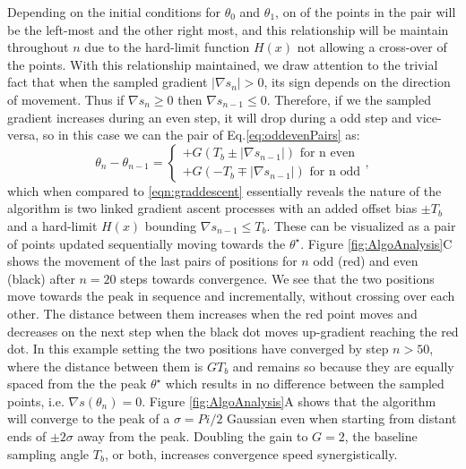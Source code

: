 \documentclass[10pt,a4paper]{article}
\begin{document}
Depending on the initial conditions for $\theta_0$ and $\theta_1$, on of the points in the pair will be the left-most and the other right most, and this relationship will be maintain throughout $n$ due to the hard-limit function $H(x)$ not allowing a cross-over of the points. With this relationship maintained, we draw attention to the trivial fact that when the sampled gradient $|\nabla s_n| > 0$, its sign depends on the direction of movement. Thus if $\nabla s_n \geq 0$ then $\nabla s_{n-1} \leq 0$. Therefore, if we the sampled gradient  increases during an even step, it will drop during a odd step and vice-versa, so in this case we can the pair of Eq.\ref{eq:oddevenPairs} as: 
\begin{equation}
\theta_n - \theta_{n-1} = 
\begin{cases}
+G (T_b \pm |\nabla s_{n-1}|) \mbox { for n even}\\
+G (-T_b \mp|\nabla s_{n-1}|) \mbox { for n odd}
\end{cases},
\label{eq:oddevenPairs}
\end{equation}
which  when compared to \eqref{eqn:graddescent} essentially reveals the nature of the algorithm is two linked gradient ascent processes with an added offset bias $\pm T_b$ and a hard-limit $H(x)$ bounding $\nabla s_{n-1} \leq T_b$. These can be visualized as a pair of points updated sequentially moving towards the $\theta^\star$.  Figure \ref{fig:AlgoAnalysis}C shows the movement of the last pairs of positions for $n$ odd (red) and even (black) after $n=20$ steps towards convergence. We see that the two positions move towards the peak in sequence and incrementally, without crossing over each other. The distance between them increases when the red point moves and decreases on the next step when the black dot moves up-gradient reaching the red dot. In this example setting the two positions have converged by step $n>50$, where the distance between them is $G T_b$ and remains so because they are equally spaced from the the peak $\theta^\star$ which results in no difference between the sampled  points, i.e. $\nabla s(\theta_n) = 0$.
Figure \ref{fig:AlgoAnalysis}A shows that the algorithm will converge to the peak of a $\sigma=Pi/2$  Gaussian even when starting from distant ends of $\pm 2\sigma$ away from the peak. Doubling the gain to $G=2$, the baseline sampling angle $T_b$, or both, increases convergence speed synergistically.
\end{document}
